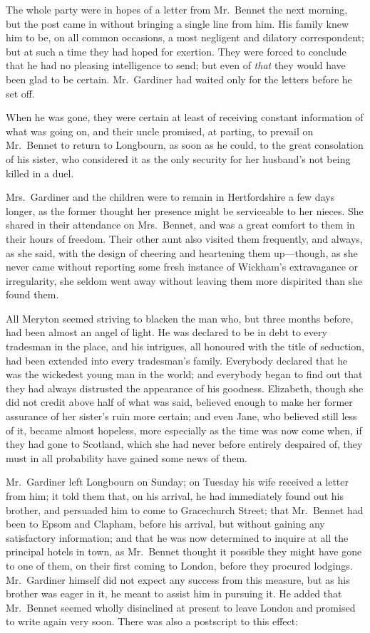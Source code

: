 \documentclass[12pt,english]{book}
\begin{document}
The whole party were in hopes of a letter from Mr.\ Bennet the next
morning, but the post came in without bringing a single line from
him. His family knew him to be, on all common occasions, a most negligent
and dilatory correspondent; but at such a time they had hoped for
exertion. They were forced to conclude that he had no pleasing intelligence
to send; but even of \textit{that} they would have been glad to be
certain. Mr.\ Gardiner had waited only for the letters before he
set off.

When he was gone, they were certain at least of receiving constant
information of what was going on, and their uncle promised, at parting,
to prevail on Mr.\ Bennet to return to Longbourn, as soon as he could,
to the great consolation of his sister, who considered it as the only
security for her husband's not being killed in a duel.

Mrs.\ Gardiner and the children were to remain in Hertfordshire a
few days longer, as the former thought her presence might be serviceable
to her nieces. She shared in their attendance on Mrs.\ Bennet, and
was a great comfort to them in their hours of freedom. Their other
aunt also visited them frequently, and always, as she said, with the
design of cheering and heartening them up\mbox{---}though, as she
never came without reporting some fresh instance of Wickham's extravagance
or irregularity, she seldom went away without leaving them more dispirited
than she found them.

All Meryton seemed striving to blacken the man who, but three months
before, had been almost an angel of light. He was declared to be in
debt to every tradesman in the place, and his intrigues, all honoured
with the title of seduction, had been extended into every tradesman's
family. Everybody declared that he was the wickedest young man in
the world; and everybody began to find out that they had always distrusted
the appearance of his goodness. Elizabeth, though she did not credit
above half of what was said, believed enough to make her former assurance
of her sister's ruin more certain; and even Jane, who believed still
less of it, became almost hopeless, more especially as the time was
now come when, if they had gone to Scotland, which she had never before
entirely despaired of, they must in all probability have gained some
news of them.

Mr.\ Gardiner left Longbourn on Sunday; on Tuesday his wife received
a letter from him; it told them that, on his arrival, he had immediately
found out his brother, and persuaded him to come to Gracechurch Street;
that Mr.\ Bennet had been to Epsom and Clapham, before his arrival,
but without gaining any satisfactory information; and that he was
now determined to inquire at all the principal hotels in town, as
Mr.\ Bennet thought it possible they might have gone to one of them,
on their first coming to London, before they procured lodgings. Mr.\ Gardiner
himself did not expect any success from this measure, but as his brother
was eager in it, he meant to assist him in pursuing it. He added that
Mr.\ Bennet seemed wholly disinclined at present to leave London
and promised to write again very soon. There was also a postscript
to this effect:
\end{document}
